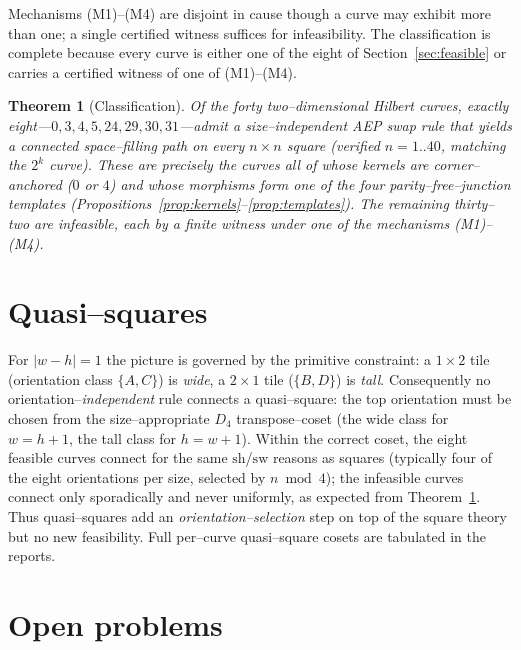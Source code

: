 \documentclass[11pt]{article}
\newtheorem{theorem}{Theorem}
\theoremstyle{definition}
\newcommand{\Dfour}{D_4}
\begin{document}
Mechanisms (M1)--(M4) are disjoint in cause though a curve may exhibit more than one; a
single certified witness suffices for infeasibility. The classification is complete because
every curve is either one of the eight of Section~\ref{sec:feasible} or carries a certified
witness of one of (M1)--(M4).

\begin{theorem}[Classification]\label{thm:main}
Of the forty two--dimensional Hilbert curves, exactly eight---$0,3,4,5,24,29,30,31$---admit
a size--independent AEP swap rule that yields a connected space--filling path on every
$n\times n$ square (verified $n=1..40$, matching the $2^k$ curve). These are precisely the
curves all of whose kernels are corner--anchored ($0$ or $4$) and whose morphisms form one
of the four parity--free--junction templates (Propositions~\ref{prop:kernels}--\ref{prop:templates}).
The remaining thirty--two are infeasible, each by a finite witness under one of the
mechanisms (M1)--(M4).
\end{theorem}

\section{Quasi--squares}\label{sec:quasi}

For $|w-h|=1$ the picture is governed by the primitive constraint: a $1\times2$ tile
(orientation class $\{A,C\}$) is \emph{wide}, a $2\times1$ tile ($\{B,D\}$) is \emph{tall}.
Consequently no orientation--\emph{independent} rule connects a quasi--square: the top
orientation must be chosen from the size--appropriate $\Dfour$ transpose--coset (the wide
class for $w=h+1$, the tall class for $h=w+1$). Within the correct coset, the eight feasible
curves connect for the same $\mathrm{sh}$/$\mathrm{sw}$ reasons as squares (typically four of
the eight orientations per size, selected by $n\bmod 4$); the infeasible curves connect only
sporadically and never uniformly, as expected from Theorem~\ref{thm:main}. Thus
quasi--squares add an \emph{orientation--selection} step on top of the square theory but no
new feasibility. Full per--curve quasi--square cosets are tabulated in the reports.

\section{Open problems}\label{sec:open}
\end{document}
